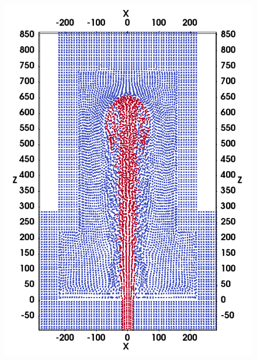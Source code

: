 \documentclass[oneside,11pt]{memoir}
\begin{document}
\begin{vplace}[0.7]
\begin{figure}[htp]
\begin{minipage}[b][][b]{.325\textwidth}
        \includegraphics[width=0.99 \textwidth]{./Figures/RSPH-t3-cutView}
    \end{minipage}%
\end{figure}

\end{vplace}
\end{document}

